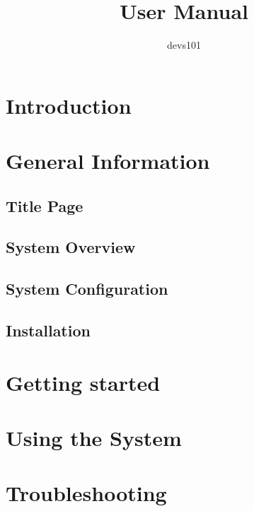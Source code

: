 \documentclass{article}
\title{User Manual}
\author{devs101}
\begin{document}
\tableofcontents
\newpage

\section{Introduction}
\section{General Information}

\subsection{Title Page}
\subsection{System Overview}
\subsection{System Configuration}
\subsection{Installation}

\section{Getting started}
\section{Using the System}
\section{Troubleshooting}
\end{document}
